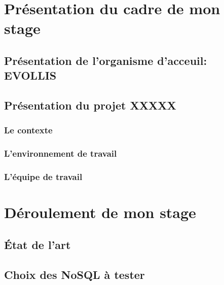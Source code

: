 \documentclass[12pt]{report}
\begin{document}




\begin{abstract}
  
\end{abstract}

\tableofcontents





\part{Présentation du cadre de mon stage}

\chapter{Présentation de l'organisme d'acceuil: {\sf EVOLLIS}}
\chapter{Présentation du projet \sf XXXXX}
\section{Le contexte}
\section{L'environnement de travail}
\section{L'équipe de travail}

\part{Déroulement de mon stage}

\chapter{État de l'art}


\chapter{Choix des \textsf{NoSQL} à tester}
\end{document}
